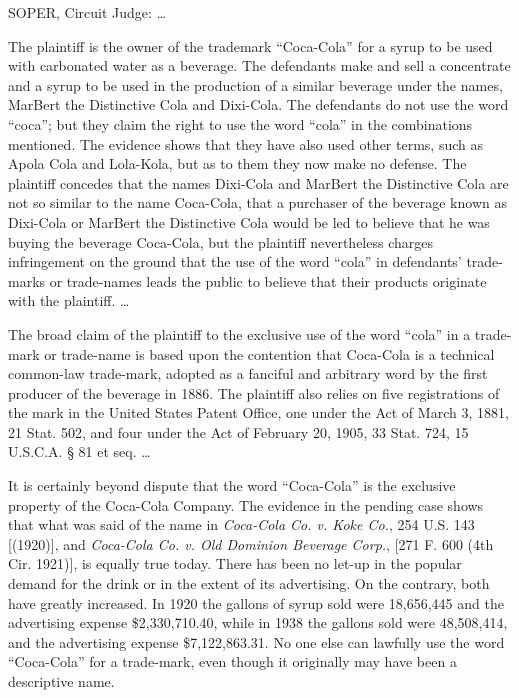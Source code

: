 
\textsc{SOPER}, Circuit Judge: {\dots}

The plaintiff is the owner of the trademark ``Coca-Cola'' for a syrup to be used
with carbonated water as a beverage. The defendants make and sell a concentrate
and a syrup to be used in the production of a similar beverage under the names,
MarBert the Distinctive Cola and Dixi-Cola. The defendants do not use the word
``coca''; but they claim the right to use the word ``cola'' in the combinations
mentioned. The evidence shows that they have also used other terms, such as
Apola Cola and Lola-Kola, but as to them they now make no defense. The
plaintiff concedes that the names Dixi-Cola and MarBert the Distinctive Cola
are not so similar to the name Coca-Cola, that a purchaser of the beverage
known as Dixi-Cola or MarBert the Distinctive Cola would be led to believe that
he was buying the beverage Coca-Cola, but the plaintiff nevertheless charges
infringement on the ground that the use of the word ``cola'' in defendants'
trade-marks or trade-names leads the public to believe that their products
originate with the plaintiff. {\dots}

The broad claim of the plaintiff to the exclusive use of the word ``cola'' in a
trade-mark or trade-name is based upon the contention that Coca-Cola is a
technical common-law trade-mark, adopted as a fanciful and arbitrary word by
the first producer of the beverage in 1886. The plaintiff also relies on five
registrations of the mark in the United States Patent Office, one under the Act
of March 3, 1881, 21 Stat. 502, and four under the Act of February 20, 1905, 33
Stat. 724, 15 U.S.C.A. {\S} 81 et seq. {\dots}

It is certainly beyond dispute that the word ``Coca-Cola'' is the exclusive
property of the Coca-Cola Company. The evidence in the pending case shows that
what was said of the name in \textit{Coca-Cola Co. v. Koke Co.}, 254 U.S. 143
[(1920)], and \textit{Coca-Cola Co. v. Old Dominion Beverage Corp.}, [271 F.
600 (4th Cir. 1921)], is equally true today. There has been no let-up in the
popular demand for the drink or in the extent of its advertising. On the
contrary, both have greatly increased. In 1920 the gallons of syrup sold were
18,656,445 and the advertising expense \$2,330,710.40, while in 1938 the
gallons sold were 48,508,414, and the advertising expense \$7,122,863.31. No
one else can lawfully use the word ``Coca-Cola'' for a trade-mark, even though
it originally may have been a descriptive name.

